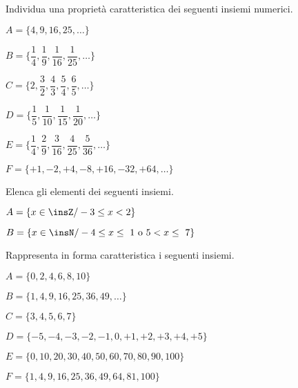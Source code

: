\begin{esercizio}
Individua una proprietà caratteristica dei seguenti insiemi numerici.
\label{ese:6.18}
\begin{multicols}{2}
\begin{enumeratea}
\spazielenx
 \item \(A=\{4,9,16,25,\ldots\}\)
 \item 
\(B=\bigg\{\dfrac{1}{4},\dfrac{1}{9},\dfrac{1}{16},\dfrac{1}{25},\ldots\bigg\}\)
 \item 
\(C=\bigg\{2,\dfrac{3}{2},\dfrac{4}{3},\dfrac{5}{4},\dfrac{6}{5},\ldots\bigg\}\)
 \item 
\(D=\bigg\{\dfrac{1}{5},\dfrac{1}{10},\dfrac{1}{15},\dfrac{1}{20},\ldots\bigg\}\)
 \item 
\(E=\bigg\{\dfrac{1}{4},\dfrac{2}{9},\dfrac{3}{16},\dfrac{4}{25},\dfrac{5}{36},
\ldots\bigg\}\)
 \item \(F=\{+1, -2, +4, -8, +16, -32, +64, \ldots\}\)
 \end{enumeratea}
\end{multicols}
\end{esercizio}

\begin{esercizio}
\label{ese:6.19}
Elenca gli elementi dei seguenti insiemi.
\begin{multicols}{2}
\begin{enumeratea}
\item \(A=\{x\in\insZ/-3\le x<2\}\)
\item \(B=\{x\in\insN/-4\le x\le~1\text{ o }5<x\le~7\}\)
\end{enumeratea}
\end{multicols}
\end{esercizio}

\begin{esercizio}
\label{ese:6.20}
Rappresenta in forma caratteristica i seguenti insiemi.
\begin{enumeratea}
\item \(A=\{0, 2, 4, 6, 8, 10\}\)
\item \(B=\{1, 4, 9, 16, 25, 36,49, \ldots\}\)
\item \(C=\{3, 4, 5, 6, 7\}\)
\item \(D=\{-5, -4, -3, -2, -1, 0, +1, +2, +3, +4, +5\}\)
\item \(E=\{0, 10, 20, 30, 40, 50, 60, 70, 80, 90, 100\}\)
\item \(F=\{1, 4, 9, 16, 25, 36, 49, 64, 81, 100\}\)
\end{enumeratea}
\end{esercizio}

